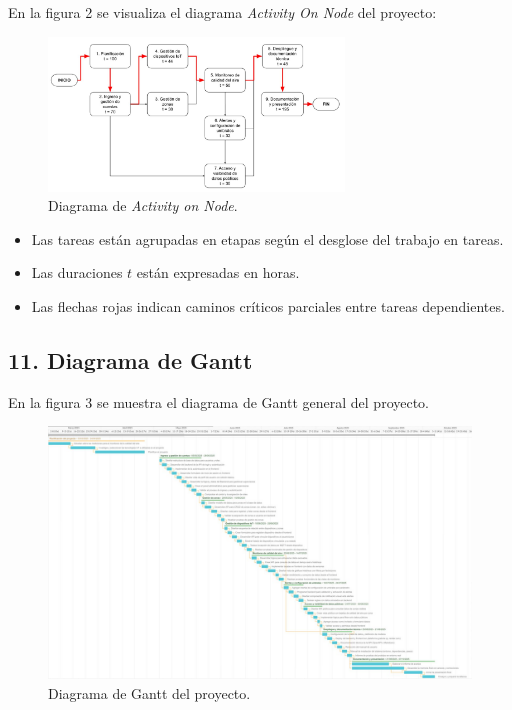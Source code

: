 \documentclass[
11pt, %
]{charter}
\begin{document}
En la figura 2 se visualiza el diagrama \textit{Activity On Node} del proyecto:

\begin{figure}[htpb]
\centering 
\includegraphics[width=0.7\textwidth]{./Figuras/fig_2-diagrama-AON.jpeg}
\caption{Diagrama de \textit{Activity on Node}.}
\label{fig:AoN}
\end{figure}

\begin{itemize}
    \item Las tareas están agrupadas en etapas según el desglose del trabajo en tareas.
    \item Las duraciones $t$ están expresadas en horas.
    \item Las flechas rojas indican caminos críticos parciales entre tareas dependientes.
\end{itemize}

\begin{landscape}
\section{11. Diagrama de Gantt}
\label{sec:gantt}

En la figura 3 se muestra el diagrama de Gantt general del proyecto.

\begin{figure}[htpb]
\centering 
\includegraphics[width=1.2\textwidth]{./Figuras/fig_3-Gantt.jpeg}
\caption{Diagrama de Gantt del proyecto.}
\label{fig:Gantt}
\end{figure}

\end{landscape}
\end{document}
